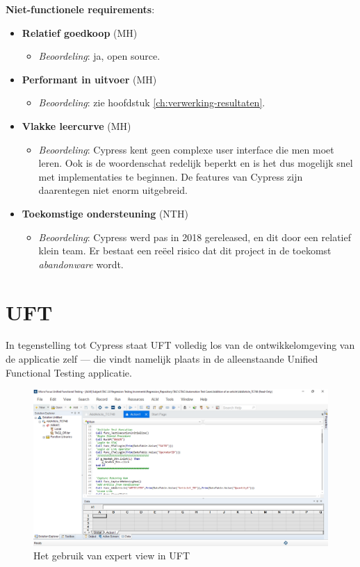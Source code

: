 \textbf{Niet-functionele requirements}:
\begin{itemize}
	\item \textbf{Relatief goedkoop} (MH)
	\begin{itemize}
		\item \emph{Beoordeling}: ja, open source.
	\end{itemize}
	\item \textbf{Performant in uitvoer} (MH)
	\begin{itemize}
		\item \emph{Beoordeling}: zie hoofdstuk \ref{ch:verwerking-resultaten}.
	\end{itemize}
	\item \textbf{Vlakke leercurve} (MH)
	\begin{itemize}
		\item \emph{Beoordeling}: Cypress kent geen complexe user interface die men moet leren. Ook is de woordenschat redelijk beperkt en is het dus mogelijk snel met implementaties te beginnen. De features van Cypress zijn daarentegen niet enorm uitgebreid.
	\end{itemize}
	\item \textbf{Toekomstige ondersteuning} (NTH)
	\begin{itemize}
		\item \emph{Beoordeling}: Cypress werd pas in 2018 gereleased, en dit door een relatief klein team. Er bestaat een reëel risico dat dit project in de toekomst \emph{abandonware} wordt.
	\end{itemize}
\end{itemize}

\section{UFT}

In tegenstelling tot Cypress staat UFT volledig los van de ontwikkelomgeving van de applicatie zelf — die vindt namelijk plaats in de alleenstaande Unified Functional Testing applicatie.

\begin{figure}[h!]
    \centering
    \includegraphics[scale=0.35]{img/corpus/uft-editaction-expertmode.PNG}
    \caption{Het gebruik van expert view in UFT}
    \label{fig:uft-expertview}
\end{figure}

